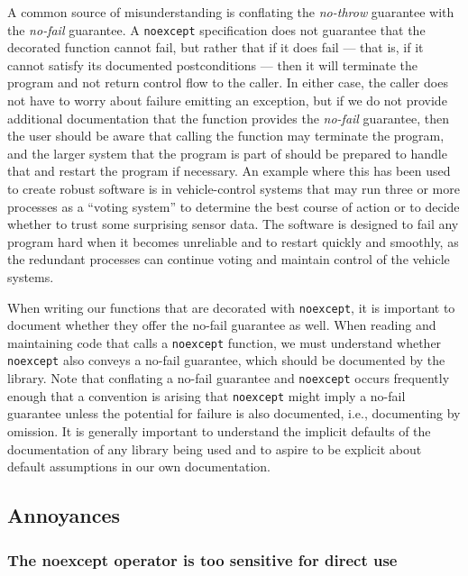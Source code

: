 A common source of misunderstanding is conflating the \emph{no-throw}
guarantee with the \emph{no-fail} guarantee. A \lstinline!noexcept!
specification does not guarantee that the decorated function cannot
fail, but rather that if it does fail --- that is, if it cannot satisfy
its documented postconditions --- then it will terminate the program and
not return control flow to the caller. In either case, the caller does
not have to worry about failure emitting an exception, but if we do not
provide additional documentation that the function provides the
\emph{no-fail} guarantee, then the user should be aware that calling the
function may terminate the program, and the larger system that the
program is part of should be prepared to handle that and restart the
program if necessary. An example where this has been used to create
robust software is in vehicle-control systems that may run three or more
processes as a ``voting system'' to determine the best course of action
or to decide whether to trust some surprising sensor data. The software
is designed to fail any program hard when it becomes unreliable and to
restart quickly and smoothly, as the redundant processes can continue
voting and maintain control of the vehicle systems.

When writing our functions that are decorated with \lstinline!noexcept!, it
is important to document whether they offer the no-fail guarantee as
well. When reading and maintaining code that calls a \lstinline!noexcept!
function, we must understand whether \lstinline!noexcept! also conveys a
no-fail guarantee, which should be documented by the library. Note that
conflating a no-fail guarantee and \lstinline!noexcept! occurs frequently
enough that a convention is arising that \lstinline!noexcept! might imply a
no-fail guarantee unless the potential for failure is also documented,
i.e., documenting by omission. It is generally important to understand
the implicit defaults of the documentation of any library being used and
to aspire to be explicit about default assumptions in our own
documentation.

\subsection[Annoyances]{Annoyances}\label{annoyances-noexceptoperator}

\subsubsection[The \lstinline!noexcept! operator is too sensitive for direct use]{The {\SubsubsecCode noexcept} operator is too sensitive for direct use}\label{the-noexcept-operator-is-too-sensitive-for-direct-use}

